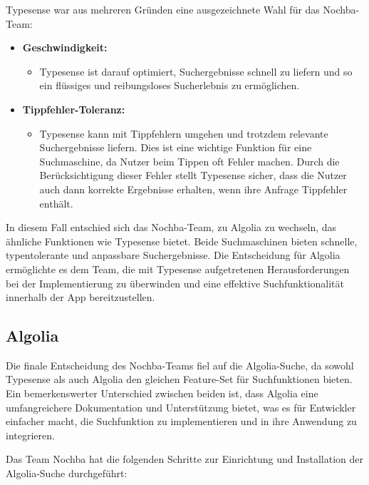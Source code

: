 Typesense war aus mehreren Gründen eine ausgezeichnete Wahl für das Nochba-Team:

\begin{itemize}
  \item \textbf{Geschwindigkeit:}
        \begin{itemize}
          \item {Typesense ist darauf optimiert, Suchergebnisse schnell zu liefern und so ein flüssiges und reibungsloses Sucherlebnis zu ermöglichen.}
        \end{itemize}
  \item \textbf{Tippfehler-Toleranz:}
        \begin{itemize}
          \item {Typesense kann mit Tippfehlern umgehen und trotzdem relevante Suchergebnisse liefern. Dies ist eine wichtige Funktion für eine Suchmaschine, da Nutzer beim Tippen oft Fehler machen. Durch die Berücksichtigung dieser Fehler stellt Typesense sicher, dass die Nutzer auch dann korrekte Ergebnisse erhalten, wenn ihre Anfrage Tippfehler enthält.}
        \end{itemize}
\end{itemize}

In diesem Fall entschied sich das Nochba-Team, zu Algolia zu wechseln, das ähnliche Funktionen wie Typesense bietet. Beide Suchmaschinen bieten schnelle, typentolerante und anpassbare Suchergebnisse. Die Entscheidung für Algolia ermöglichte es dem Team, die mit Typesense aufgetretenen Herausforderungen bei der Implementierung zu überwinden und eine effektive Suchfunktionalität innerhalb der App bereitzustellen.

\subsection{Algolia}

Die finale Entscheidung des Nochba-Teams fiel auf die Algolia-Suche, da sowohl Typesense als auch Algolia den gleichen Feature-Set für Suchfunktionen bieten. Ein bemerkenswerter Unterschied zwischen beiden ist, dass Algolia eine umfangreichere Dokumentation und Unterstützung bietet, was es für Entwickler einfacher macht, die Suchfunktion zu implementieren und in ihre Anwendung zu integrieren.

Das Team Nochba hat die folgenden Schritte zur Einrichtung und Installation der Algolia-Suche durchgeführt:

